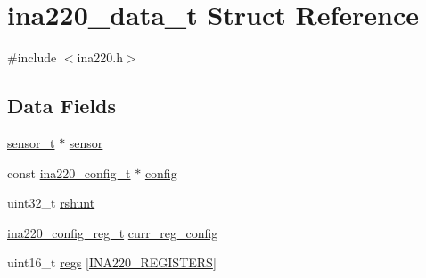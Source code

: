 \hypertarget{structina220__data__t}{\section{ina220\-\_\-data\-\_\-t Struct Reference}
\label{structina220__data__t}
}


{\ttfamily \#include $<$ina220.\-h$>$}

\subsection*{Data Fields}
\begin{DoxyCompactItemize}
\item 
\hyperlink{structsensor__t}{sensor\-\_\-t} $\ast$ \hyperlink{structina220__data__t_a85ddc5c273af09f18918bd65bdeda59c}{sensor}
\item 
const \hyperlink{structina220__config__t}{ina220\-\_\-config\-\_\-t} $\ast$ \hyperlink{structina220__data__t_a7317d63abff33be7841c2bc1c559758d}{config}
\item 
uint32\-\_\-t \hyperlink{structina220__data__t_a511c78dab60e5481576b4e7adfe81356}{rshunt}
\item 
\hyperlink{unionina220__config__reg__t}{ina220\-\_\-config\-\_\-reg\-\_\-t} \hyperlink{structina220__data__t_a745545113f33db1b66ea2af9c3c40013}{curr\-\_\-reg\-\_\-config}
\item 
uint16\-\_\-t \hyperlink{structina220__data__t_a21bfa527de4daa7f1ac60e31ba3d89f6}{regs} \mbox{[}\hyperlink{ina220_8h_a277720760a0d7cacc8e79a31e17325cd}{I\-N\-A220\-\_\-\-R\-E\-G\-I\-S\-T\-E\-R\-S}\mbox{]}
\end{DoxyCompactItemize}


